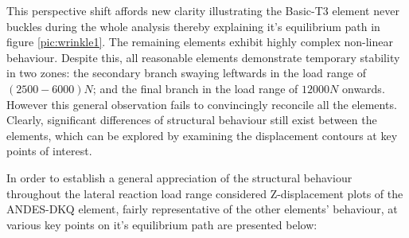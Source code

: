 This perspective shift affords new clarity illustrating the Basic-T3 element never buckles during the whole analysis thereby explaining it's equilibrium path in figure \ref{pic:wrinkle1}. The remaining elements exhibit highly complex non-linear behaviour. Despite this, all reasonable elements demonstrate temporary stability in two zones: the secondary branch swaying leftwards in the load range of $(2500 - 6000)N$; and the final branch in the load range of $12000 N$ onwards. However this general observation fails to convincingly reconcile all the elements. Clearly, significant differences of structural behaviour still exist between the elements, which can be explored by examining the displacement contours at key points of interest.

In order to establish a general appreciation of the structural behaviour throughout the lateral reaction load range considered Z-displacement plots of the ANDES-DKQ element, fairly representative of the other elements' behaviour, at various key points on it's equilibrium path are presented below:

